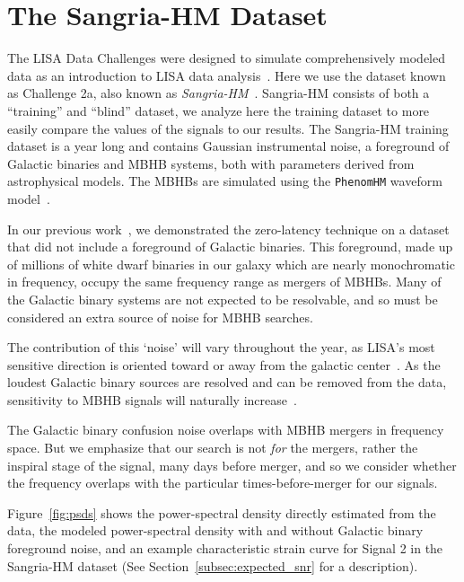 \section{The Sangria-HM Dataset}
\label{sec:dataset}


The LISA Data Challenges were designed to simulate comprehensively modeled data as an introduction
to LISA data analysis~\cite{Baghi:2022ucj, LDC_WEBSITE}.
Here we use the dataset known as Challenge 2a, also known as
\textit{Sangria-HM}~\cite{LDC_WEBSITE_SANGRIA_HM}.
Sangria-HM  consists of both a ``training'' and ``blind'' dataset, we analyze here the training dataset to more easily compare the values of the signals to our results.
The Sangria-HM training dataset is a year long and contains Gaussian instrumental noise, a foreground of
Galactic binaries and \ac{MBHB} systems, both with parameters derived from astrophysical models.
The \acp{MBHB} are simulated using the \texttt{PhenomHM} waveform model~\cite{Garcia-Quiros:2020qpx}.

In our previous work~\cite{CabournDavies:2024hea}, we demonstrated the zero-latency technique
on a dataset that did not include a foreground of Galactic binaries.
This foreground, made up of millions of white dwarf binaries in our galaxy which are nearly monochromatic in frequency, occupy the same frequency range as mergers of \acp{MBHB}.
Many of the Galactic binary systems are not expected to be resolvable, and so must be considered an extra source of noise for \ac{MBHB} searches.

The contribution of this `noise' will vary throughout the year, as LISA's most sensitive direction is oriented toward or away from the galactic center~\cite{Colpi:2024xhw,Seto:2004ji}.
As the loudest Galactic binary sources are resolved and can be removed from the data, sensitivity to \ac{MBHB} signals will naturally increase~\cite{Crowder:2006eu,Strub:2024kbe}.

The Galactic binary confusion noise overlaps with \ac{MBHB} mergers in frequency space.
But we emphasize that our search is not \textit{for} the mergers,
rather the inspiral stage of the signal, many days before merger, and so we consider whether the frequency overlaps with the
particular times-before-merger for our signals.

Figure~\ref{fig:psds} shows the power-spectral density directly estimated from the data, the modeled power-spectral density with and without Galactic binary foreground noise, and an example
characteristic strain curve for Signal 2 in the Sangria-HM dataset (See Section~\ref{subsec:expected_snr} for a description).


